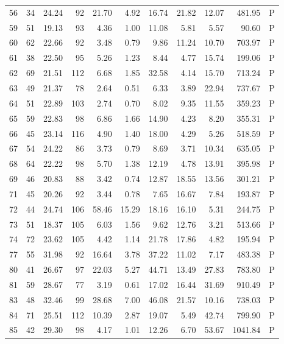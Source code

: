 \begin{table}[ht]
\begin{tabular}{rrrrrrrrrrl}
  56 &  34 & 24.24 &  92 & 21.70 & 4.92 & 16.74 & 21.82 & 12.07 & 481.95 & P \\ 
  59 &  51 & 19.13 &  93 & 4.36 & 1.00 & 11.08 & 5.81 & 5.57 & 90.60 & P \\ 
  60 &  62 & 22.66 &  92 & 3.48 & 0.79 & 9.86 & 11.24 & 10.70 & 703.97 & P \\ 
  61 &  38 & 22.50 &  95 & 5.26 & 1.23 & 8.44 & 4.77 & 15.74 & 199.06 & P \\ 
  62 &  69 & 21.51 & 112 & 6.68 & 1.85 & 32.58 & 4.14 & 15.70 & 713.24 & P \\ 
  63 &  49 & 21.37 &  78 & 2.64 & 0.51 & 6.33 & 3.89 & 22.94 & 737.67 & P \\ 
  64 &  51 & 22.89 & 103 & 2.74 & 0.70 & 8.02 & 9.35 & 11.55 & 359.23 & P \\ 
  65 &  59 & 22.83 &  98 & 6.86 & 1.66 & 14.90 & 4.23 & 8.20 & 355.31 & P \\ 
  66 &  45 & 23.14 & 116 & 4.90 & 1.40 & 18.00 & 4.29 & 5.26 & 518.59 & P \\ 
  67 &  54 & 24.22 &  86 & 3.73 & 0.79 & 8.69 & 3.71 & 10.34 & 635.05 & P \\ 
  68 &  64 & 22.22 &  98 & 5.70 & 1.38 & 12.19 & 4.78 & 13.91 & 395.98 & P \\ 
  69 &  46 & 20.83 &  88 & 3.42 & 0.74 & 12.87 & 18.55 & 13.56 & 301.21 & P \\ 
  71 &  45 & 20.26 &  92 & 3.44 & 0.78 & 7.65 & 16.67 & 7.84 & 193.87 & P \\ 
  72 &  44 & 24.74 & 106 & 58.46 & 15.29 & 18.16 & 16.10 & 5.31 & 244.75 & P \\ 
  73 &  51 & 18.37 & 105 & 6.03 & 1.56 & 9.62 & 12.76 & 3.21 & 513.66 & P \\ 
  74 &  72 & 23.62 & 105 & 4.42 & 1.14 & 21.78 & 17.86 & 4.82 & 195.94 & P \\ 
  77 &  55 & 31.98 &  92 & 16.64 & 3.78 & 37.22 & 11.02 & 7.17 & 483.38 & P \\ 
  80 &  41 & 26.67 &  97 & 22.03 & 5.27 & 44.71 & 13.49 & 27.83 & 783.80 & P \\ 
  81 &  59 & 28.67 &  77 & 3.19 & 0.61 & 17.02 & 16.44 & 31.69 & 910.49 & P \\ 
  83 &  48 & 32.46 &  99 & 28.68 & 7.00 & 46.08 & 21.57 & 10.16 & 738.03 & P \\ 
  84 &  71 & 25.51 & 112 & 10.39 & 2.87 & 19.07 & 5.49 & 42.74 & 799.90 & P \\ 
  85 &  42 & 29.30 &  98 & 4.17 & 1.01 & 12.26 & 6.70 & 53.67 & 1041.84 & P \\ 

\end{tabular}
\end{table}
